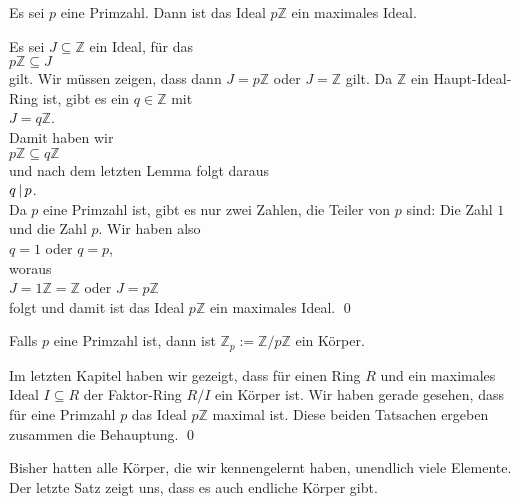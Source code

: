 \begin{Satz}
  Es sei $p$ eine Primzahl.  Dann ist das Ideal $p\mathbb{Z}$ ein maximales Ideal.
\end{Satz}

\proof
Es sei $J \subseteq \mathbb{Z}$ ein Ideal, f\"{u}r das
\\[0.2cm]
\hspace*{1.3cm}
$p\mathbb{Z} \subseteq J$ 
\\[0.2cm]
gilt.  Wir m\"{u}ssen zeigen, dass dann $J = p\mathbb{Z}$ oder $J = \mathbb{Z}$ gilt.  Da $\mathbb{Z}$ ein
Haupt-Ideal-Ring ist, gibt es ein $q \in \mathbb{Z}$ mit
\\[0.2cm]
\hspace*{1.3cm}
$J = q\mathbb{Z}$.
\\[0.2cm]
Damit haben wir 
\\[0.2cm]
\hspace*{1.3cm}
$p\mathbb{Z} \subseteq q\mathbb{Z}$
\\[0.2cm]
und nach dem letzten Lemma folgt daraus
\\[0.2cm]
\hspace*{1.3cm}
$q \,|\, p$.
\\[0.2cm]
Da $p$ eine Primzahl ist, gibt es nur zwei Zahlen, die Teiler von $p$ sind: Die Zahl $1$ und die Zahl $p$.
Wir haben also
\\[0.2cm]
\hspace*{1.3cm}
$q = 1$ \quad oder \quad $q = p$,
\\[0.2cm]
woraus
\\[0.2cm]
\hspace*{1.3cm}
$J = 1\mathbb{Z} = \mathbb{Z}$ \quad oder \quad $J = p\mathbb{Z}$
\\[0.2cm]
folgt und damit ist das Ideal $p\mathbb{Z}$ ein maximales Ideal.  \qed

\begin{Korollar}
Falls $p$ eine Primzahl ist, dann ist $\mathbb{Z}_p := \mathbb{Z}/p\mathbb{Z}$ ein K\"{o}rper.
\end{Korollar}

\proof
Im letzten Kapitel haben wir gezeigt, dass f\"{u}r einen Ring $R$ und ein maximales Ideal
$I \subseteq R$ der Faktor-Ring $R/I$ ein K\"{o}rper ist.  Wir haben gerade gesehen, dass f\"{u}r eine Primzahl
$p$ das Ideal $p\mathbb{Z}$ maximal ist.  Diese beiden Tatsachen ergeben zusammen die Behauptung. \qed

\remark
Bisher hatten alle K\"{o}rper, die wir kennengelernt haben, unendlich viele Elemente.
Der letzte Satz zeigt uns, dass es auch endliche K\"{o}rper gibt.


